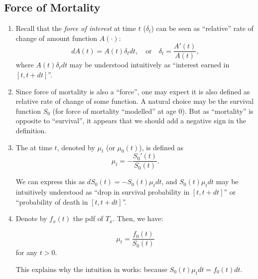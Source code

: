 \subsection{Force of Mortality}
\begin{enumerate}
\item Recall that the \emph{force of interest} at time \(t\) (\(\delta_t\)) can
be seen as ``relative'' rate of change of amount function \(A(\cdot)\):
\[
dA(t)=A(t)\delta_tdt,\quad\text{or}\quad
\delta_t=\frac{A'(t)}{A(t)},
\]
where \(A(t)\delta_tdt\) may be understood intuitively as ``interest earned in
\([t,t+dt]\)''.

\item Since force of mortality is also a ``force'', one may expect it is also
defined as relative rate of change of some function. A natural choice may be
the survival function \(S_0\) (for force of mortality ``modelled'' at age 0).
But as ``mortality'' is opposite to ``survival'', it appears that we should add
a negative sign in the definition.

\item \label{it:fom} The  at
time \(t\), denoted by \(\mu_t\) (or \(\mu_0(t)\)), is defined as
\[
\mu_t=-\frac{S_0'(t)}{S_0(t)}.
\]
\begin{intuition}
We can express this as \(dS_0(t)=-S_0(t)\mu_tdt\), and \(S_0(t)\mu_tdt\) may be
intuitively understood as ``drop in survival probability in \([t,t+dt]\)'' or
``probability of death in \([t,t+dt]\)''.

 \end{intuition}
\item Denote by \(f_x(t)\) the pdf of \(T_x\). Then, we have:
\begin{proposition}
\label{prp:mu-pdf-0}
\[
\mu_t=\frac{f_0(t)}{S_0(t)}
\]
for any \(t>0\).
\end{proposition}

\begin{note}
This explains why the intuition in  works: because
\(S_0(t)\mu_tdt=f_0(t)dt\).
\end{note}


\end{enumerate}
